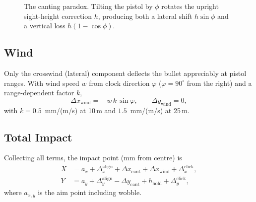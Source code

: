 \documentclass[11pt]{article}
\begin{document}
\begin{figure}[H]
\centering
{}
\caption{The canting paradox. Tilting the pistol by $\phi$ rotates the upright
sight-height correction $h$, producing both a lateral shift $h\sin\phi$ and a
vertical loss $h(1-\cos\phi)$.}
\label{fig:cantfig}
\end{figure}

\subsection{Wind}

Only the crosswind (lateral) component deflects the bullet appreciably at
pistol ranges.  With wind speed $w$ from clock direction $\varphi$
($\varphi = 90^\circ$ from the right) and a range-dependent factor $k$,
\begin{equation}
  \Delta x_{\text{wind}} = -\,w\,k\,\sin\varphi, \qquad \Delta y_{\text{wind}} = 0,
\end{equation}
with $k = 0.5$~mm/(m/s) at 10\,m and $1.5$~mm/(m/s) at 25\,m.

\subsection{Total Impact}

Collecting all terms, the impact point (mm from centre) is
\begin{align}
  X &= a_x + \Delta_x^{\text{align}} + \Delta x_{\text{cant}} + \Delta x_{\text{wind}} + \Delta_x^{\text{click}},\\
  Y &= a_y + \Delta_y^{\text{align}} - \Delta y_{\text{cant}} + h_{\text{hold}} + \Delta_y^{\text{click}},
\end{align}
where $a_{x,y}$ is the aim point including wobble.
\end{document}
